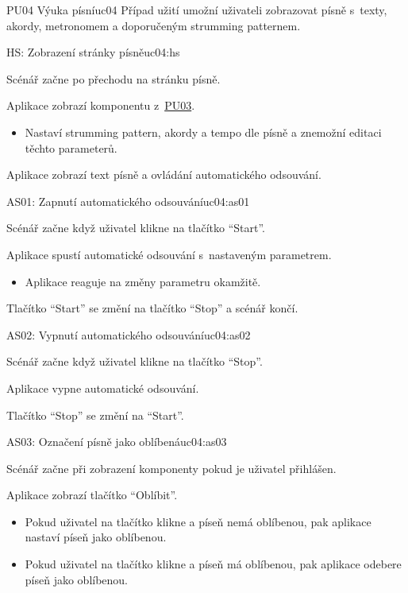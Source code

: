 \begin{usecase}{PU04 Výuka písní}{uc04}
    Případ užití umožní uživateli zobrazovat písně s~texty, akordy, metronomem a doporučeným strumming patternem.

    \begin{scenario}{HS: Zobrazení stránky písně}{uc04:hs}
        \item Scénář začne po přechodu na stránku písně.
        \item Aplikace zobrazí komponentu z~\hyperref[uc03]{PU03}.
        \begin{itemize}
            \item Nastaví strumming pattern, akordy a tempo dle písně a znemožní editaci těchto parameterů.
        \end{itemize}
        \item Aplikace zobrazí text písně a ovládání automatického odsouvání.
    \end{scenario}

    \begin{scenario}{AS01: Zapnutí automatického odsouvání}{uc04:as01}
        \item Scénář začne když uživatel klikne na tlačítko \enquote{Start}.
        \item Aplikace spustí automatické odsouvání s~nastaveným parametrem.
        \begin{itemize}
            \item Aplikace reaguje na změny parametru okamžitě.
        \end{itemize}
        \item Tlačítko \enquote{Start} se změní na tlačítko \enquote{Stop} a scénář končí.
    \end{scenario}

    \begin{scenario}{AS02: Vypnutí automatického odsouvání}{uc04:as02}
        \item Scénář začne když uživatel klikne na tlačítko \enquote{Stop}.
        \item Aplikace vypne automatické odsouvání.
        \item Tlačítko \enquote{Stop} se změní na \enquote{Start}.
    \end{scenario}

    \begin{scenario}{AS03: Označení písně jako oblíbená}{uc04:as03}
        \item Scénář začne při zobrazení komponenty pokud je uživatel přihlášen.
        \item Aplikace zobrazí tlačítko \enquote{Oblíbit}.
        \begin{itemize}
            \item Pokud uživatel na tlačítko klikne a píseň nemá oblíbenou, pak aplikace nastaví píseň jako oblíbenou.
            \item Pokud uživatel na tlačítko klikne a píseň má oblíbenou, pak aplikace odebere píseň jako oblíbenou.
        \end{itemize}
    \end{scenario}
\end{usecase}
